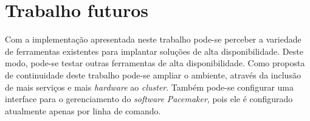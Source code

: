 \newpage

\section{Trabalho futuros}
\label{section:trabalhosfuturos}

Com a implementação apresentada neste trabalho pode-se perceber a variedade de ferramentas existentes para implantar soluções de alta 
disponibilidade. Deste modo, pode-se testar outras ferramentas de alta disponibilidade.
Como proposta de continuidade deste trabalho pode-se ampliar o ambiente, através da inclusão de mais serviços e mais \textit{hardware} ao 
\textit{cluster}. Também pode-se configurar uma interface para o gerenciamento do \textit{software} \textit{Pacemaker}, pois ele é configurado 
atualmente apenas por linha de comando.

